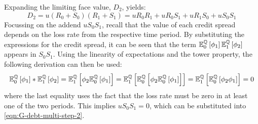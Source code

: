 \documentclass[main.tex]{subfiles}
\begin{document}
        Expanding the limiting face value, $D_{2}$, yields:
        \begin{equation*}
            D_2 = u(R_0 + S_0)(R_1 + S_1) = u R_0 R_1 + u R_0 S_1 + u R_1 S_0 + u S_0 S_1
        \end{equation*}
        Focussing on the addend $u S_0 S_1$, recall that the value of each credit spread depends on the loss rate from the respective time period.
        By substituting the expressions for the credit spread, it can be seen that the term
        $\mathbb{E}_{0}^{\mathbb{Q}}\left[\phi_1\right]\mathbb{E}_{1}^{\mathbb{Q}}\left[\phi_2\right]$
        appears in $S_0 S_1$.
        Using the linearity of expectations and the tower property, the following derivation can then be used:
        \begin{equation*}
            \mathbb{E}_{0}^{\mathbb{Q}}\left[\phi_1\right]
            * \mathbb{E}_{1}^{\mathbb{Q}}\left[\phi_2\right]
            = \mathbb{E}_{1}^{\mathbb{Q}}\left[
                \phi_2 \mathbb{E}_{0}^{\mathbb{Q}}\left[\phi_1\right]
            \right] 
            = \mathbb{E}_{1}^{\mathbb{Q}}\left[
                \mathbb{E}_{0}^{\mathbb{Q}}\left[
                    \phi_2
                    \mathbb{E}_{0}^{\mathbb{Q}}\left[
                        \phi_1
                    \right]
                \right]
            \right]
            = \mathbb{E}_{1}^{\mathbb{Q}}\left[
                \mathbb{E}_{0}^{\mathbb{Q}}\left[
                    \phi_2 \phi_1
                \right]
            \right]
            = 0
        \end{equation*}
        where the last equality uses the fact that the loss rate must be zero in at least one of the two periods.
        This implies $u S_0 S_1 = 0$, which can be substituted into \cref{eqn:G-debt-multi-step-2}.
        
\end{document}
